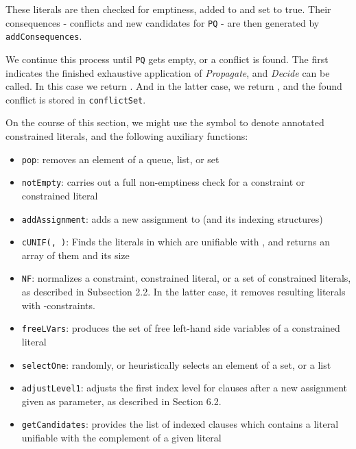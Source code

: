 \documentclass[a4paper]{article}
\begin{document}
{These literals are then checked for emptiness, added to  and set to true.
Their consequences - conflicts and new candidates for \texttt{PQ} - 
are then generated by \texttt{addConsequences}.

We continue this process until \texttt{PQ} gets empty, or a conflict is found.
The first indicates the finished exhaustive application of \emph{Propagate}, and \emph{Decide} can be called. 
In this case we return . And in the latter case, we return , and the found conflict is 
stored in \texttt{conflictSet}.

On the course of this section, we might use the symbol  to denote annotated constrained literals, and the following 
auxiliary functions:
\begin{itemize}
	\item \texttt{pop}: removes an element of a queue, list, or set
	\item \texttt{notEmpty}: carries out a full non-emptiness check for a constraint or constrained literal
	\item \texttt{addAssignment}: adds a new assignment to  (and its indexing structures)
	\item \texttt{cUNIF(, )}: Finds the literals in  which are unifiable with , and returns an array of them and its size
	\item \texttt{NF}: normalizes a constraint, constrained literal, or a set of constrained literals, as described in Subsection 2.2. In the latter case, it removes resulting literals with -constraints.
	\item \texttt{freeLVars}: produces the set of free left-hand side variables of a constrained literal
	\item \texttt{selectOne}: randomly, or heuristically selects an element of a set, or a list
	\item \texttt{adjustLevel1}: adjusts the first index level for clauses after a new assignment given as parameter, as described in Section 6.2.
	\item \texttt{getCandidates}: provides the list of indexed clauses which contains a literal unifiable with the complement of a given literal
\end{itemize}
\begin{function}
	

\end{function}}
\end{document}
